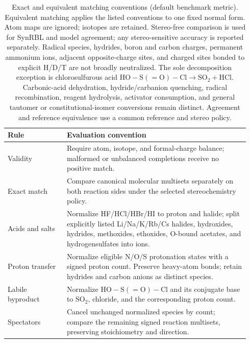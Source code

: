 \begin{table}[t]
\centering
\small
\begin{tabular}{p{0.23\linewidth}p{0.71\linewidth}}
\hline
Rule & Evaluation convention \\
\hline
Validity & Require atom, isotope, and formal-charge balance; malformed or unbalanced completions receive no positive match. \\
Exact match & Compare canonical molecular multisets separately on both reaction sides under the selected stereochemistry policy. \\
Acids and salts & Normalize HF/HCl/HBr/HI to proton and halide; split explicitly listed Li/Na/K/Rb/Cs halides, hydroxides, hydrides, methoxides, ethoxides, O-bound acetates, and hydrogensulfates into ions. \\
Proton transfer & Normalize eligible N/O/S protonation states with a signed proton count. Preserve heavy-atom bonds; retain hydrides and carbon anions as distinct species. \\
Labile byproduct & Normalize $\mathrm{HO{-}S(=O){-}Cl}$ and its conjugate base to $\mathrm{SO_2}$, chloride, and the corresponding proton count. \\
Spectators & Cancel unchanged normalized species by count; compare the remaining signed reaction multisets, preserving stoichiometry and direction. \\
\hline
\end{tabular}
\caption{Exact and equivalent matching conventions (default benchmark metric).
Equivalent matching applies the listed conventions to one fixed normal form.
Atom maps are ignored; isotopes are retained. Stereo-free comparison is used
for SynRBL and model agreement; any stereo-sensitive accuracy is reported
separately. Radical species, hydrides, boron and carbon charges, permanent ammonium ions, adjacent opposite-charge sites, and charged
sites bonded to explicit H/D/T are not broadly neutralized. The sole decomposition exception is chlorosulfurous acid
$\mathrm{HO{-}S(=O){-}Cl \rightarrow SO_2 + HCl}$.
Carbonic-acid dehydration, hydride/carbanion quenching, radical recombination,
reagent hydrolysis, activator consumption, and general tautomer or
constitutional-isomer conversions remain distinct.
Agreement and reference equivalence use a common reference and stereo policy.}
\label{tab:equivalence_rules}
\end{table}

